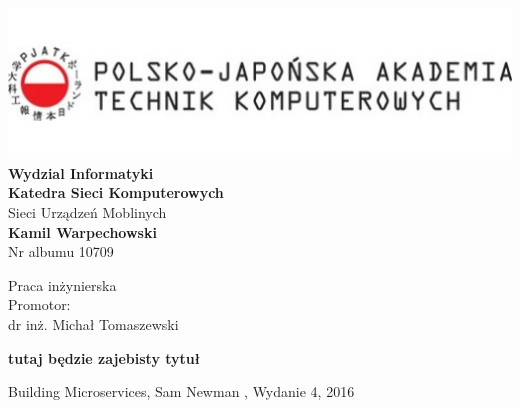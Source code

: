 



\thispagestyle{firststyle}
\begin{center}
\includegraphics[width=1\textwidth]{images/logo.jpg}
\textbf{Wydzial Informatyki} \\
\vspace{3em}
\textbf{Katedra Sieci Komputerowych} \\
Sieci Urządzeń Moblinych \\
\vspace{3em}
\textbf{Kamil Warpechowski} \\
Nr albumu 10709
\end{center}


\vspace{3em}
{\addtolength{\leftskip}{70mm}

\noindent
Praca inżynierska
\\Promotor:
\\dr inż. Michał Tomaszewski

}

\vspace{3em}

\textbf {
	tutaj będzie zajebisty tytuł
}

\newpage
\tableofcontents
\newpage
  










\newpage
\thispagestyle{empty}
  
\listoffigures
\listoftables
\lstlistoflistings


\begin{thebibliography}{99}
 Building Microservices,  Sam Newman , Wydanie 4, 2016
\end{thebibliography}


